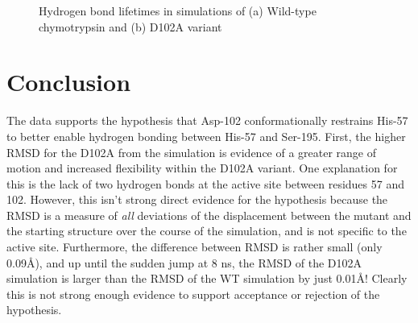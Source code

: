\documentclass[11pt, twocolumn]{article}
\begin{document}
\begin{figure}[H]
    \centering


    \caption{Hydrogen bond lifetimes in simulations of
        (a) Wild-type chymotrypsin and (b) D102A variant
        }\label{fig:hbond_times}
\end{figure}


\newpage
\section{Conclusion}

The data supports the hypothesis that Asp-102 conformationally restrains His-57
to better enable hydrogen bonding between His-57 and Ser-195.
First, the higher RMSD for the D102A from the simulation is evidence of a
greater range of motion and increased flexibility within the D102A variant.
One explanation for this is the lack of two hydrogen bonds at the active site
between residues 57 and 102. However, this isn't strong direct evidence for
the hypothesis because the RMSD is a measure of \textit{all} deviations of
the displacement between the mutant and the starting structure over the course
of the simulation, and is not specific to the active site. Furthermore, the
difference between RMSD is rather small (only 0.09\AA{}), and up until the
sudden jump at 8 ns, the RMSD of the D102A simulation is larger than the RMSD
of the WT simulation by just 0.01\AA{}! Clearly this is not strong enough
evidence to support acceptance or rejection of the hypothesis.
\end{document}
